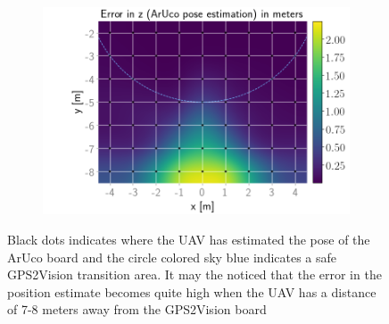 \documentclass[../Head/report.tex]{subfiles}
\begin{document}
\begin{figure}[H]
\begin{subfigure}[t]{.337\textwidth}
        \caption{}
        \label{fig:GPS2Vision_pose_estimation_test1_error_y}
    \end{subfigure}
    \hspace{-0.9em}
    \begin{subfigure}[t]{.337\textwidth}
        \centering
        \includegraphics[width=\textwidth]{../Figures/GPS2Vision_pose_estimation_test/test1_aruco_board_width_0.2_space_0.1/aruco_pose_estimation_error_z.png}
        \caption{}
        \label{fig:GPS2Vision_pose_estimation_test1_error_z}
    \end{subfigure}
    \caption{Black dots indicates where the UAV has estimated the pose of the ArUco board and the circle colored sky blue indicates a safe GPS2Vision transition area. It may the noticed that the error in the position estimate becomes quite high when the UAV has a distance of 7-8 meters away from the GPS2Vision board}
    \label{fig:GPS2Vision_pose_estimation_test1_error_pos}
\end{figure}
\end{document}
